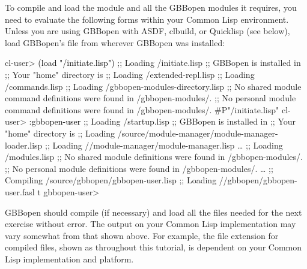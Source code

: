 \documentclass[10pt,twoside,english,pdftex]{article}
\begin{document}
%
%
To compile and load the  module and all the GBBopen
modules it requires, you need to evaluate the following forms within your
Common Lisp environment.  Unless you are using GBBopen with ASDF, clbuild, or
Quicklisp (see below), load GBBopen's
 file from wherever GBBopen
was installed:
%
\W\supp
\begin{smallexample}
\textcolor{darkergray}{%
  cl-user> \textcolor{black}{(load "/initiate.lisp")}
  ;; Loading /initiate.lisp
  ;; GBBopen is installed in 
  ;; Your "home" directory is 
  ;;     Loading /extended-repl.lisp
  ;;     Loading /commands.lisp
  ;;     Loading /gbbopen-modules-directory.lisp
  ;; No shared module command definitions were found in /gbbopen-modules/.
  ;; No personal module command definitions were found in /gbbopen-modules/.
  #P"/initiate.lisp"
  cl-user> \textcolor{black}{:gbbopen-user}
  ;; Loading /startup.lisp
  ;; GBBopen is installed in 
  ;; Your "home" directory is 
  ;;  Loading /source/module-manager/module-manager-loader.lisp
  ;; Loading //module-manager/module-manager.lisp
     \textrm{\ldots{}}
  ;; Loading /modules.lisp
  ;; No shared module definitions were found in /gbbopen-modules/.
  ;; No personal module definitions were found in /gbbopen-modules/.
     \textrm{\ldots{}}
  ;; Compiling /source/gbbopen/gbbopen-user.lisp
  ;; Loading //gbbopen/gbbopen-user.fasl
  t
  gbbopen-user>}
\end{smallexample}

GBBopen should compile (if necessary) and load all the files needed for the
next exercise without error.  The output on your Common Lisp implementation
may vary somewhat from that shown above.  For example, the file extension for
compiled files, shown as  throughout this tutorial, is dependent on
your Common Lisp implementation and platform.
\end{document}

